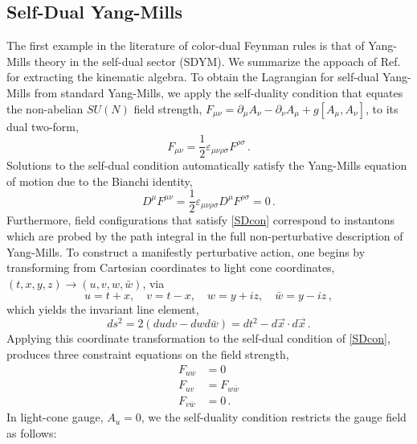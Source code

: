 \documentclass[11pt,letter]{article}
\begin{document}
\subsection{Self-Dual Yang-Mills} The first example in the literature
of color-dual Feynman rules is that of Yang-Mills theory in the
self-dual sector (SDYM).  We summarize the appoach of
Ref.~\cite{Monteiro2011pc} for extracting the kinematic algebra.
To obtain the Lagrangian for self-dual Yang-Mills from standard Yang-Mills, we apply the
self-duality condition that equates the non-abelian $SU(N)$ field
strength,
$F_{\mu\nu} = \partial_\mu A_\nu -\partial_\nu A_\mu + g[A_\mu
,A_\nu]$, to its dual two-form,
\begin{equation}
  \label{SDcon} F_{\mu\nu} = \frac{1}{2}
  \varepsilon_{\mu\nu\rho\sigma}F^{\rho\sigma} \,.
\end{equation}
Solutions to the self-dual condition automatically satisfy the
Yang-Mills equation of motion due to the Bianchi identity,
\begin{equation}
D^\mu F^{\mu\nu} = \frac{1}{2} \varepsilon_{\mu\nu\rho\sigma}D^\mu F^{\rho\sigma} = 0 \,.
\end{equation}
Furthermore, field configurations that satisfy \cref{SDcon} correspond to instantons which are probed by the path integral in the full non-perturbative description of Yang-Mills. To construct a manifestly perturbative action, one begins by
transforming from Cartesian coordinates to light cone coordinates,
$(t,x,y,z) \rightarrow (u,v,w,\bar{w})$, via
\begin{equation}
u = t+x,\quad v=t-x, \quad w = y+iz, \quad \bar{w} = y-iz\, ,
\end{equation}
which yields the invariant line element,
\begin{equation}
ds^2 = 2(dudv - dwd\bar{w}) = dt^2 - d\vec{x}\cdot d\vec{x} \,.
\end{equation}
Applying this coordinate transformation to the self-dual condition of
\cref{SDcon}, produces three constraint equations on the field strength,
\begin{align} \label{SDLightCone1}
F_{uw} &=0
\\
 \label{SDLightCone2}
 F_{uv} &= F_{w\bar{w}}
\\
 \label{SDLightCone3}
 F_{v\bar{w}} &= 0\,.
\end{align}
In light-cone gauge, $A_u=0$, we the self-duality condition restricts the gauge field as follows:
\end{document}
